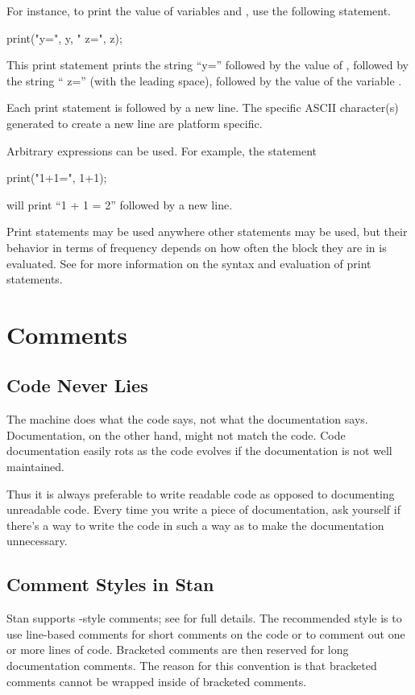 For instance, to print the value of variables  and
, use the following statement.
%
\begin{stancode}
print("y=", y, " z=", z);
\end{stancode}
%
This print statement prints the string ``y='' followed by the value of
, followed by the string `` z=''
(with the leading space), followed by the value of the variable
.

Each print statement is followed by a new line.  The specific ASCII
character(s) generated to create a new line are platform specific.

Arbitrary expressions can be used.  For example, the statement
\begin{stancode}
print("1+1=", 1+1);
\end{stancode}
%
will print ``1 + 1 = 2'' followed by a new line.

Print statements may be used anywhere other statements may be used,
but their behavior in terms of frequency depends on how often the
block they are in is evaluated.  See  for
more information on the syntax and evaluation of print statements.



\section{Comments}\label{comments-programming.section}

\subsection{Code Never Lies}

The machine does what the code says, not what the documentation says.
Documentation, on the other hand, might not match the code.  Code
documentation easily rots as the code evolves if the documentation is
not well maintained.  

Thus it is always preferable to write readable code as opposed to
documenting unreadable code.  Every time you write a piece of
documentation, ask yourself if there's a way to write the code in such
a way as to make the documentation unnecessary.


\subsection{Comment Styles in Stan}

Stan supports \Cpp-style comments; see  for full
details.  The recommended style is to use line-based comments for
short comments on the code or to comment out one or more
lines of code.  Bracketed comments are then reserved for long
documentation comments.  The reason for this convention is that
bracketed comments cannot be wrapped inside of bracketed comments.

